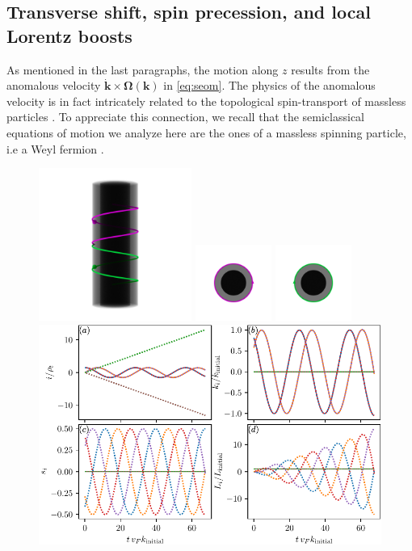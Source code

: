 \documentclass[submission, Phys]{SciPost}
\begin{document}
\subsection{Transverse shift, spin precession, and local Lorentz boosts}
As mentioned in the last paragraphs, the motion along $z$ results from the anomalous velocity $\dot{\bm{k}}\times\bm{\Omega}(\bm{k})$ in \cref{eq:seom}. The physics of the anomalous velocity is in fact intricately related to the topological spin-transport of massless particles \cite{Stone15,MStone,Stone16,Bliokh04,Bliokh_2005}. To appreciate this connection, we recall that the semiclassical equations of motion we analyze here are the ones of a massless spinning particle, i.e a Weyl fermion \cite{Duval_2015a, Duval_2015b}.

\begin{figure}[ht!]
    \centering
    \includegraphics[height=5cm, valign=c]{fig/unstable_orbit.png}
    \hfil
    \includegraphics[height=2.5cm, valign=c]{fig/unstable_orbit_ortho_1.png}
    \hfil
    \includegraphics[height=2.5cm, valign=c]{fig/unstable_orbit_ortho_2.png}
    \includegraphics{fig/unstable_orbit.pdf}

\end{figure}
\end{document}
